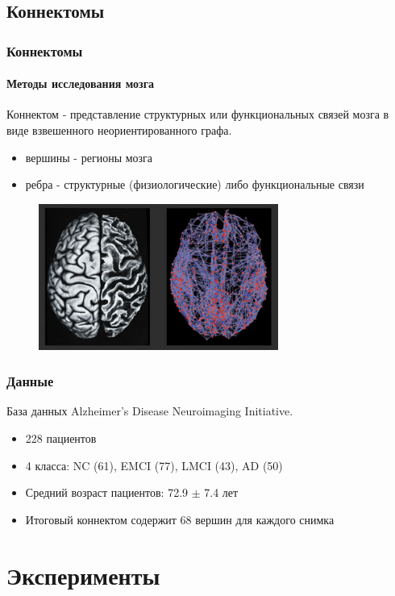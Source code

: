 \documentclass[xcolor=table]{beamer}
\begin{document}
    \subsection[Коннектомы]{Коннектомы}
    \begin{frame}
    \frametitle{Коннектомы}
    \framesubtitle{Методы исследования мозга}
    Коннектом - представление структурных или функциональных связей мозга в виде взвешенного неориентированного графа.
    \begin{itemize}
        \item вершины - регионы мозга
        \item ребра - структурные (физиологические) либо функциональные связи
    \end{itemize}
    \begin{figure}[h]
    	\centering
    	\includegraphics[width=0.7\textwidth]{./img/connectome_pres}
    \end{figure}
    \end{frame}
    
\begin{frame}
    \frametitle{Данные}
    База данных Alzheimer's Disease Neuroimaging Initiative.
    \begin{itemize}
        \item 228 пациентов
        \item 4 класса: NC (61), EMCI (77), LMCI (43), AD (50)
        \item Средний возраст пациентов: 72.9 $\pm$ 7.4 лет
        \item Итоговый коннектом содержит 68 вершин для каждого снимка
    \end{itemize}
    \end{frame}

\section[Эксперименты]{Эксперименты}  
\end{document}
